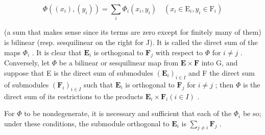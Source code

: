 \[
\Phi ((x _ {i}), (y _ {i})) = \sum_ {i} \Phi_ {i} (x _ {i}, y _ {i}) \quad (x _ {i} \in \mathrm{E} _ {i}, y _ {i} \in \mathrm{F} _ {i})\tag{10}
\]

(a sum that makes sense since its terms are zero except for finitely many of them) is bilinear (resp. sesquilinear on the right for J). It is called the direct sum of the maps \(\Phi_{i}\) . It is clear that \(\mathbf{E}_{i}\) is orthogonal to \(\mathbf{F}_{j}\) with respect to \(\Phi\) for \(i \neq j\) . Conversely, let \(\Phi\) be a bilinear or sesquilinear map from \(\mathbf{E} \times \mathbf{F}\) into G, and suppose that E is the direct sum of submodules \((\mathbf{E}_{i})_{i \in I}\) and F the direct sum of submodules \((\mathbf{F}_{i})_{i \in I}\) such that \(\mathbf{E}_{i}\) is orthogonal to \(\mathbf{F}_{j}\) for \(i \neq j\) ; then \(\Phi\) is the direct sum of its restrictions to the products \(\mathbf{E}_{i} \times \mathbf{F}_{i} (i \in I)\) .

For \(\Phi\) to be nondegenerate, it is necessary and sufficient that each of the \(\Phi_{i}\) be so; under these conditions, the submodule orthogonal to \(\mathbf{E}_{i}\) is \(\sum_{j\neq i}\mathbf{F}_{j}\) .

